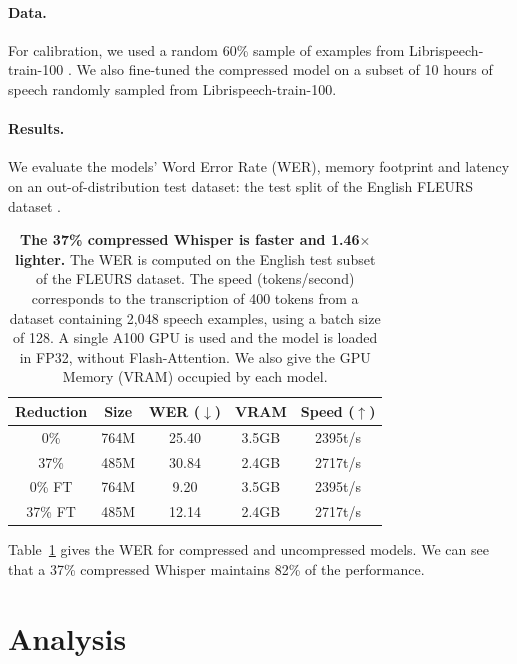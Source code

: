 \paragraph{Data.} For calibration, we used a random 60\% sample of examples from Librispeech-train-100 \citep{librispeech}. We also fine-tuned the compressed model on a subset of 10 hours of speech randomly sampled from Librispeech-train-100.

\paragraph{Results.} We evaluate the models' Word Error Rate (WER), memory footprint and latency on an out-of-distribution test dataset: the test split of the English FLEURS dataset \citep{fleurs}.

\begin{table}[!ht]
    {\small{
    \begin{tabular}{ccccc}
    \toprule
        \textbf{Reduction} &\textbf{Size} & \textbf{WER ($\downarrow$)}  & \textbf{VRAM} & \textbf{Speed} ($\uparrow$) \\
    \midrule
        0\% & 764M & 25.40 & 3.5GB & 2395t/s\\
        37\%  & 485M & 30.84 & 2.4GB & 2717t/s \\
        0\% {\scriptsize FT} & 764M & 9.20 & 3.5GB & 2395t/s \\
        37\% {\scriptsize FT} & 485M & 12.14 & 2.4GB & 2717t/s \\ 
    \bottomrule
    \end{tabular}
    }}
    \caption{\textbf{The 37\% compressed Whisper is faster and 1.46$\times$ lighter.} The WER is computed on the English test subset of the FLEURS dataset. The speed (tokens/second) corresponds to the transcription of 400 tokens from a dataset containing 2,048 speech examples, using a batch size of 128. A single A100 GPU is used and the model is loaded in FP32, without Flash-Attention. We also give the GPU Memory (VRAM) occupied by each model.}
    \label{tab:wer}
\end{table}

Table~\ref{tab:wer} gives the WER for compressed and uncompressed models. We can see that a 37\% compressed Whisper maintains 82\% of the performance.

\section{Analysis}


